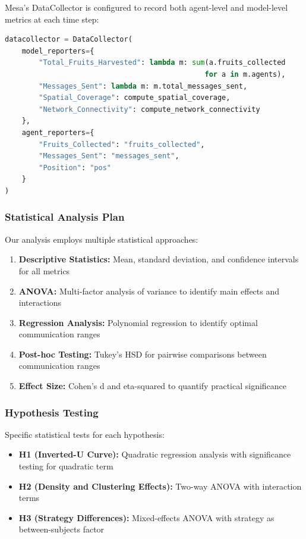 \documentclass[12pt,a4paper]{article}
\begin{document}
Mesa's DataCollector is configured to record both agent-level and model-level metrics at each time step:

\begin{lstlisting}[language=Python, caption=Data Collection Configuration]
datacollector = DataCollector(
    model_reporters={
        "Total_Fruits_Harvested": lambda m: sum(a.fruits_collected
                                               for a in m.agents),
        "Messages_Sent": lambda m: m.total_messages_sent,
        "Spatial_Coverage": compute_spatial_coverage,
        "Network_Connectivity": compute_network_connectivity
    },
    agent_reporters={
        "Fruits_Collected": "fruits_collected",
        "Messages_Sent": "messages_sent",
        "Position": "pos"
    }
)
\end{lstlisting}

\subsubsection{Statistical Analysis Plan}

Our analysis employs multiple statistical approaches:

\begin{enumerate}
    \item \textbf{Descriptive Statistics:} Mean, standard deviation, and confidence intervals for all metrics
    \item \textbf{ANOVA:} Multi-factor analysis of variance to identify main effects and interactions
    \item \textbf{Regression Analysis:} Polynomial regression to identify optimal communication ranges
    \item \textbf{Post-hoc Testing:} Tukey's HSD for pairwise comparisons between communication ranges
    \item \textbf{Effect Size:} Cohen's d and eta-squared to quantify practical significance
\end{enumerate}

\subsubsection{Hypothesis Testing}

Specific statistical tests for each hypothesis:

\begin{itemize}
    \item \textbf{H1 (Inverted-U Curve):} Quadratic regression analysis with significance testing for quadratic term
    \item \textbf{H2 (Density and Clustering Effects):} Two-way ANOVA with interaction terms
    \item \textbf{H3 (Strategy Differences):} Mixed-effects ANOVA with strategy as between-subjects factor
\end{itemize}
\end{document}
